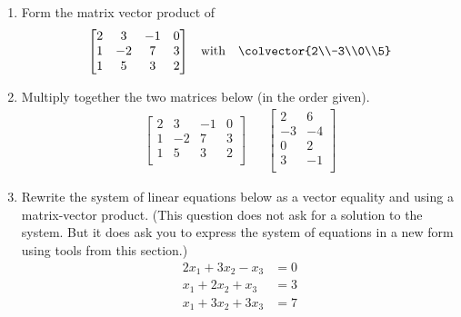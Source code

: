 \begin{enumerate}
%
\item Form the matrix vector product of
%
\begin{align*}
\begin{bmatrix}
2 & 3 & -1 & 0\\
1 & -2 & 7 & 3\\
1 & 5 & 3 & 2\\
\end{bmatrix}
&&\text{with}&&
\colvector{2\\-3\\0\\5}
\end{align*}
%
\item  Multiply together the two matrices below (in the order given).
%
\begin{align*}
\begin{bmatrix}
2 & 3 & -1 & 0\\ 
1 & -2 & 7 & 3\\ 
1 & 5 & 3 & 2\\
\end{bmatrix}
&&
\begin{bmatrix}
2 & 6\\
-3 & -4\\
0 & 2\\
3 & -1\\
\end{bmatrix}
\end{align*}
%
\item Rewrite the system of linear equations below as a vector equality and using a matrix-vector product.  (This question does not ask for a solution to the system.  But it does ask you to express the system of equations in a new form using tools from this section.)
%
\begin{align*}
2x_1 + 3x_2 - x_3 &= 0\\
x_1 + 2x_2 + x_3 &= 3\\
x_1 + 3x_2 + 3x_3 &= 7
\end{align*}
%
\end{enumerate}